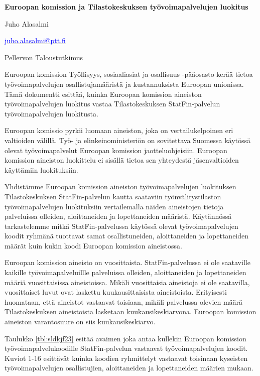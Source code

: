 \documentclass[12pt]{article}
\begin{document}
\noindent \textbf{Euroopan komission ja Tilastokeskuksen työvoimapalvelujen luokitus} \par
\vspace{0.5cm}

\noindent Juho Alasalmi{\par}
\noindent \href{mailto: juho.alasalmi@ptt.fi}{\textcolor{blue}{juho.alasalmi@ptt.fi}}{\par}
\noindent Pellervon Taloustutkimus {\par}

\vspace{0.5cm}

Euroopan komission Työllisyys, sosiaaliasiat ja osallisuus -pääosasto kerää tietoa työvoimapalvelujen osallistujamääristä ja kustannuksista Euroopan unionissa. Tämä dokumentti esittää, kuinka Euroopan komission aineiston työvoimapalvelujen luokitus vastaa Tilastokeskuksen StatFin-palvelun työvoimapalvelujen luokitusta. 

Euroopan komissio pyrkii luomaan aineiston, joka on vertailukelpoinen eri valtioiden välillä. Työ- ja elinkeinoministeriön on sovitettava Suomessa käytössä olevat työvoimapalvelut Euroopan komission jaotteluohjeisiin. Euroopan komission aineiston luokittelu ei sisällä tietoa sen yhteydestä jäsenvaltioiden käyttämiin luokituksiin. 

Yhdistämme Euroopan komission aineiston työvoimapalvelujen luokituksen Tilastokeskuksen StatFin-palvelun kautta saataviin työnvälitystilaston työvoimapalvelujen luokituksiin vertailemalla näiden aineistojen tietoja palveluissa olleiden, aloittaneiden ja lopettaneiden määristä. Käytännössä tarkastelemme mitkä StatFin-palvelussa käytössä olevat työvoimapalvelujen koodit ryhmänä tuottavat samat osallistuneiden, aloittaneiden ja lopettaneiden määrät kuin kukin koodi Euroopan komission aineistossa.

Euroopan komission aineisto on vuosittaista. StatFin-palvelussa ei ole saataville kaikille työvoimapalveluillle palveluissa olleiden, aloittaneiden ja lopettaneiden määriä vuosittaisissa aineistoissa. Mikäli vuosittaisia aineistoja ei ole saatavilla, vuosittaiset luvut ovat laskettu kuukausittaisista aineistoista. Erityisesti huomataan, että aineistot vastaavat toisiaan, mikäli palvelussa olevien määrä Tilastokeskuksen aineistoista lasketaan kuukausikeskiarvona. Euroopan komission aineiston varantosuure on siis kuukausikeskiarvo.

Taulukko \ref{tbl:sldkjf23} esitää avaimen joka antaa kullekin Euroopan komission työvoimapalvelukoodille StatFin-palvelun vastaavat työvoimapalvelujen koodit. Kuviot 1-16 esittävät kuinka koodien ryhmittelyt vastaavat toisinaan kyseisten työvoimapalvelujen osallistujien, aloittaneiden ja lopettaneiden määrien mukaan.
\end{document}
